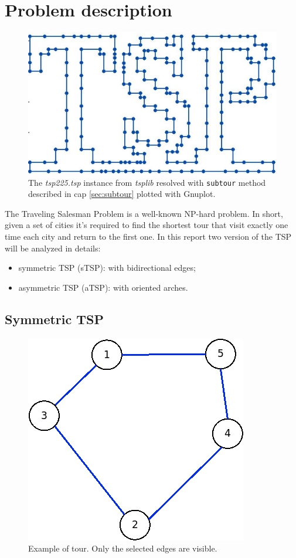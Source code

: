 \chapter{Problem description}
\label{chapter:TSPdescription}
\begin{figure}[h]
	\centering
	\includegraphics[width=.5\columnwidth]{img/tsp225_plot}
	\caption{The \textit{tsp225.tsp} instance from \textit{tsplib} resolved with \texttt{subtour} method described in cap \ref{sec:subtour} plotted with Gnuplot.}
	\label{fig:tsp225}
\end{figure}

The Traveling Salesman Problem is a well-known NP-hard problem. In short, given a set of cities it's required to find the shortest tour that visit exactly one time each city and return to the first one.
In this report two version of the TSP will be analyzed in details:
\begin{itemize}
	\item symmetric TSP (sTSP): with bidirectional edges;
 	\item asymmetric TSP (aTSP): with oriented arches.
\end{itemize}


\section{Symmetric TSP}

\begin{figure}[h]
	\centering
	\includegraphics[width=.3\columnwidth]{img/symTSP_example.png}
	\caption{Example of tour. Only the selected edges are visible.}
	\label{fig:symTSP}
\end{figure}

